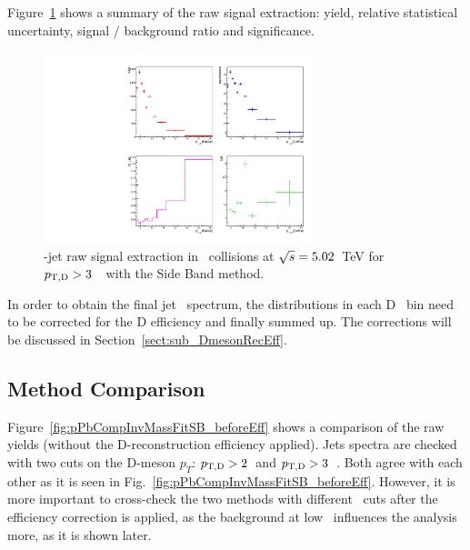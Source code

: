 Figure~\ref{fig:eq_pPb_RSU_raw_Dbins} shows a summary of the raw signal extraction:
yield, relative statistical uncertainty, signal / background ratio and significance.

\begin{figure}[bth]
\centering
\includegraphics[width=0.7\textwidth]{pPbplots/plotsSB_noEff_pt3_noDetails/signalParams_FASTwoSDD_pTD3}
\caption{\Dstar-jet raw signal extraction in \pPb\ collisions at $\sqrt{s}=5.02$~TeV for $p_{\mathrm{T,D}}>3$~\GeVc\ with the Side Band method.}
\label{fig:eq_pPb_RSU_raw_Dbins}
\end{figure}

In order to obtain the final jet \pt\ spectrum, the distributions in each D \pt\ bin need to be corrected for the D efficiency and finally summed up.
The corrections will be discussed in Section~\ref{sect:sub_DmesonRecEff}. 

\subsection{Method Comparison}

Figure~\ref{fig:pPbCompInvMassFitSB_beforeEff} shows a comparison of the raw yields (without the D-reconstruction efficiency applied). Jets spectra are checked with two cuts on the D-meson $p_{T}$: $p_{\mathrm{T,D}}>2$~\GeVc and $p_{\mathrm{T,D}}>3$~\GeVc. Both agree with each other as it is seen in Fig.~\ref{fig:pPbCompInvMassFitSB_beforeEff}. However, it is more important to cross-check the two methods with different \ptd\ cuts after the efficiency correction is applied, as the background at low \ptd\ influences the analysis more, as it is shown later.

